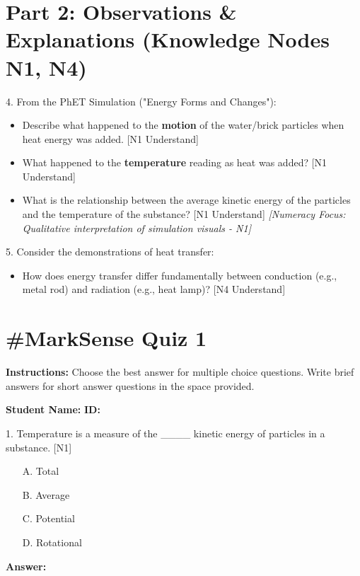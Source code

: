 \documentclass[11pt, a4paper]{article}
\begin{document}
\section*{Part 2: Observations & Explanations (Knowledge Nodes N1, N4)}

4.  From the PhET Simulation ("Energy Forms and Changes"):
    \begin{itemize}
        \item Describe what happened to the \textbf{motion} of the water/brick particles when heat energy was added. [N1 Understand] \vspace{1cm}
        \item What happened to the \textbf{temperature} reading as heat was added? [N1 Understand] \vspace{1cm}
        \item What is the relationship between the average kinetic energy of the particles and the temperature of the substance? [N1 Understand] \vspace{1cm}
        \textit{[Numeracy Focus: Qualitative interpretation of simulation visuals - N1]}
    \end{itemize}

5.  Consider the demonstrations of heat transfer:
    \begin{itemize}
        \item How does energy transfer differ fundamentally between conduction (e.g., metal rod) and radiation (e.g., heat lamp)? [N4 Understand] \vspace{2cm}
    \end{itemize}


\hrulefill
\section*{\#MarkSense Quiz 1}
\textbf{Instructions:} Choose the best answer for multiple choice questions. Write brief answers for short answer questions in the space provided.

\vspace{0.5cm}
\textbf{Student Name:} \underline{\hspace{5cm}} \textbf{ID:} \underline{\hspace{3cm}}
\vspace{0.5cm}

1.  Temperature is a measure of the \_\_\_\_ kinetic energy of particles in a substance. [N1]
    \begin{itemize}
        \item[A.] Total
        \item[B.] Average
        \item[C.] Potential
        \item[D.] Rotational
    \end{itemize}
    \textbf{Answer:} \underline{\hspace{1cm}}
\end{document}
